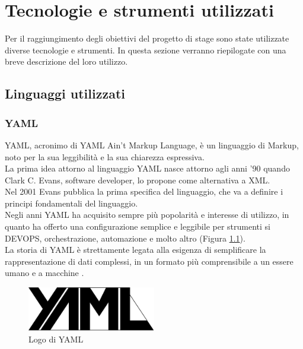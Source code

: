 \chapter{Tecnologie e strumenti utilizzati}\label{cap:Tecnologie e strumenti utilizzati}
Per il raggiungimento degli obiettivi del progetto di stage sono state utilizzate diverse tecnologie e strumenti. 
In questa sezione verranno riepilogate con una breve descrizione del loro utilizzo. 
\section{Linguaggi utilizzati}
\subsection{YAML}
YAML, acronimo di YAML Ain't Markup Language, è un linguaggio di Markup, noto per la sua leggibilità e la sua 
chiarezza espressiva. \\
La prima idea attorno al linguaggio YAML nasce attorno agli anni '90 quando Clark C. Evans, software developer, lo propone come alternativa a XML.\\
Nel 2001 Evans pubblica la prima specifica del linguaggio, che va a definire i principi fondamentali del linguaggio.\\
Negli anni YAML ha acquisito sempre più popolarità e interesse di utilizzo, in quanto ha offerto una configurazione semplice e leggibile 
per strumenti si DEVOPS, orchestrazione, automazione e molto altro (Figura \ref{fig:yaml}).\\
La storia di YAML è strettamente legata alla esigenza di semplificare la rappresentazione di dati complessi, 
in un formato più comprensibile a un essere umano e a macchine \cite{site:History_Yaml}.\\
\begin{figure}[hpp]
    \centering
    \includegraphics[width=0.5\textwidth]{images/tecnologie/logo_yaml.png}
    \caption{Logo di YAML}
    \label{fig:yaml}
\end{figure}
\pagebreak
